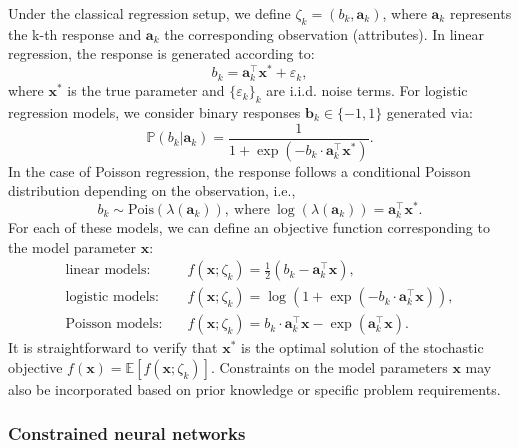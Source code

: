 \documentclass[aos]{imsart}
\numberwithin{equation}{section}
\theoremstyle{plain}
\begin{document}
Under the classical regression setup, we define $\zeta_k = \left(b_k, \bm{a}_k \right)$, where $\bm{a}_k$ represents the k-th response and $\bm{a}_k$ the corresponding observation (attributes).
In linear regression, the response is generated according to:
\begin{equation*}
    b_k = \bm{a}_k^{\top} \bm{x}^{*} + \varepsilon_k,
\end{equation*}
where $\bm{x}^{*}$ is the true parameter and $\{\varepsilon_k\}_{k}$ are i.i.d. noise terms. For logistic regression models, we consider binary responses $\bm{b}_k \in \{-1,1\}$ generated via:
\begin{equation*}
    \mathbb{P}\left(b_k| \bm{a}_k\right) = \frac{1}{1 + \exp \left( -b_k \cdot \bm{a}_k^{\top} \bm{x}^{*} \right)}.
\end{equation*}
In the case of Poisson regression, the response follows a conditional Poisson distribution depending on the observation, i.e., 
\begin{equation*}
    b_k \sim \text{Pois}\left( \lambda(\bm{a}_k)\right), ~\text{where}~\log(\lambda(\bm{a}_k)) =  \bm{a}_k^{\top} \bm{x}^{*}.
\end{equation*}
For each of these models, we can define an objective function corresponding to the model parameter $\bm{x}$:
\begin{equation*}
    \begin{split}
        \text{linear models:} & \hspace{1em} f(\bm{x};\zeta_k) = \frac{1}{2} \left(b_k - \bm{a}_k^{\top} \bm{x} \right),\\
        \text{logistic models:} & \hspace{1em} f(\bm{x};\zeta_k) = \log\left(1 + \exp \left( -b_k \cdot \bm{a}_k^{\top} \bm{x}  \right) \right),\\
        \text{Poisson models:} & \hspace{1em} f(\bm{x};\zeta_k) = b_k \cdot \bm{a}_k^{\top} \bm{x} - \exp \left(\bm{a}_k^{\top} \bm{x} \right).
    \end{split}
\end{equation*}
It is straightforward to verify that  $\bm{x}^{*}$ is the optimal solution of the stochastic objective $f(\bm{x}) = \mathbb{E}\left[ f(\bm{x};\zeta_k) 
 \right]$. Constraints on the model parameters $\bm{x}$ may also be incorporated based on prior knowledge or specific problem requirements.


\subsubsection{Constrained neural networks}
\end{document}
